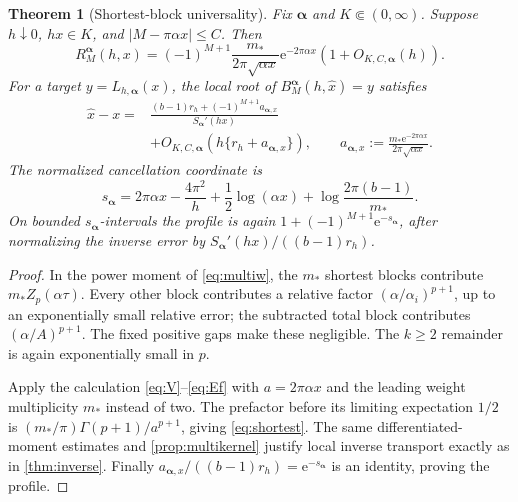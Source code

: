 \documentclass[11pt,a4paper]{article}
\newcommand{\ee}{\mathrm e}
\numberwithin{equation}{section}
\theoremstyle{plain}
\newtheorem{theorem}{Theorem}[section]
\theoremstyle{definition}
\theoremstyle{remark}
\begin{document}
\begin{theorem}[Shortest-block universality]
\label{thm:shortest}
Fix $\boldsymbol\alpha$ and $K\Subset(0,\infty)$. Suppose $h\downarrow0$,
$hx\in K$, and $|M-\pi\alpha x|\le C$. Then
\begin{equation}
 \boxed{R_M^{\boldsymbol\alpha}(h,x)
 =(-1)^{M+1}\frac{m_*}{2\pi\sqrt{\alpha x}}\ee^{-2\pi\alpha x}
                         (1+O_{K,C,\boldsymbol\alpha}(h)).}
 \label{eq:shortest}
\end{equation}
For a target $y=L_{h,\boldsymbol\alpha}(x)$, the local root of
$B_M^{\boldsymbol\alpha}(h,\widehat x)=y$ satisfies
\begin{align}
 \widehat x-x
 ={}&\frac{(b-1)r_h+(-1)^{M+1}a_{\boldsymbol\alpha,x}}
             {S_{\boldsymbol\alpha}'(hx)}\nonumber\\
 &+O_{K,C,\boldsymbol\alpha}\left(h\{r_h+a_{\boldsymbol\alpha,x}\}\right),
 \qquad
 a_{\boldsymbol\alpha,x}:=
        \frac{m_*\ee^{-2\pi\alpha x}}{2\pi\sqrt{\alpha x}}.
 \label{eq:multiinverse}
\end{align}
The normalized cancellation coordinate is
\begin{equation}
 s_{\boldsymbol\alpha}
 =2\pi\alpha x-\frac{4\pi^2}{h}+\frac12\log(\alpha x)
                       +\log\frac{2\pi(b-1)}{m_*}.
 \label{eq:multis}
\end{equation}
On bounded $s_{\boldsymbol\alpha}$-intervals the profile is again
$1+(-1)^{M+1}\ee^{-s_{\boldsymbol\alpha}}$, after normalizing the inverse
error by $S_{\boldsymbol\alpha}'(hx)/((b-1)r_h)$.
\end{theorem}
\begin{proof}
In the power moment of \eqref{eq:multiw}, the $m_*$ shortest blocks contribute
$m_* Z_p(\alpha\tau)$. Every other block contributes a relative factor
$(\alpha/\alpha_i)^{p+1}$, up to an exponentially small relative error;
the subtracted total block contributes $(\alpha/A)^{p+1}$. The fixed positive
gaps make these negligible. The $k\ge2$ remainder is again exponentially
small in $p$.

Apply the calculation \eqref{eq:V}--\eqref{eq:Ef} with
$a=2\pi\alpha x$ and the leading weight multiplicity $m_*$ instead of two.
The prefactor before its limiting expectation $1/2$ is
$(m_*/\pi)\Gamma(p+1)/a^{p+1}$, giving \eqref{eq:shortest}.
The same differentiated-moment estimates and \cref{prop:multikernel}
justify local inverse transport exactly as in \cref{thm:inverse}.
Finally $a_{\boldsymbol\alpha,x}/((b-1)r_h)=\ee^{-s_{\boldsymbol\alpha}}$
is an identity, proving the profile.
\end{proof}
\end{document}
